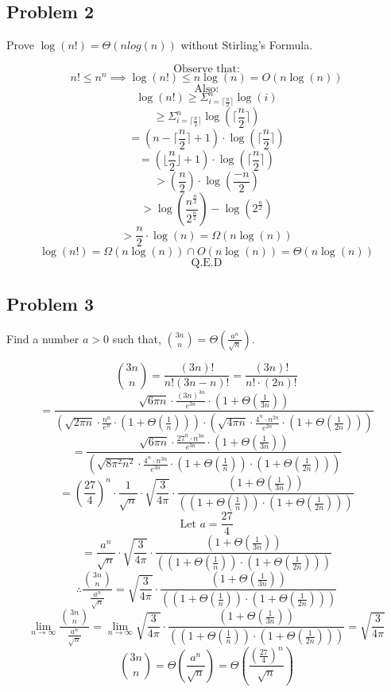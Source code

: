 \documentclass{article}
\begin{document}
\subsection{Problem 2}
Prove $\log(n!) = \Theta(n log(n))$ without Stirling's Formula.

$$\text{Observe that:}$$
$$n! \le n^n \implies \log(n!) \le n\log(n) = O(n\log(n))$$
$$\text{Also:}$$
$$\log(n!) \ge \Sigma_{i = \lceil \frac{n}{2} \rceil}^{n} \log(i)$$
$$\ge \Sigma_{i = \lceil \frac{n}{2} \rceil}^{n} \log(\lceil \frac{n}{2} \rceil)$$
$$= (n - \lceil \frac{n}{2} \rceil +1) \cdot \log(\lceil \frac{n}{2} \rceil)$$
$$= (\lfloor \frac{n}{2} \rfloor +1) \cdot \log(\lceil \frac{n}{2} \rceil)$$
$$> (\frac{n}{2}) \cdot \log(\frac{-n}{2})$$
$$> \log(\frac{n^{\frac{n}{2}}}{2^\frac{n}{2}}) - \log(2^\frac{n}{2})$$
$$> \frac{n}{2} \cdot \log(n) = \Omega(n \log(n))$$
$$\log(n!) = \Omega(n\log(n)) \cap O(n\log(n)) = \Theta(n \log(n))$$
$$\text{Q.E.D}$$


\subsection{Problem 3}
Find a number $a > 0$ such that, $\binom{3n}{n} = \Theta(\frac{a^n}{\sqrt{n}})$.

$$\binom{3n}{n} = \frac{(3n)!}{n!(3n-n)!} = \frac{(3n)!}{n! \cdot (2n)!}$$
$$= \frac{\sqrt{6\pi n} \cdot \frac{(3n)^{3n}}{e^{3n}} \cdot (1 + \Theta(\frac{1}{3n})) }{(\sqrt{2\pi n} \cdot \frac{n^n}{e^n} \cdot (1 + \Theta(\frac{1}{n})) ) \cdot (\sqrt{4 \pi n} \cdot \frac{4^n \cdot n^{2n}}{e^{2n}} \cdot (1 + \Theta(\frac{1}{2n})))  }$$
$$= \frac{\sqrt{6\pi n} \cdot \frac{27^n \cdot n^{3n}}{e^{3n}} \cdot (1 + \Theta(\frac{1}{3n})) }{(\sqrt{8\pi^2 n^2} \cdot \frac{4^n \cdot n^{3n}}{e^{3n}} \cdot (1 + \Theta(\frac{1}{n})) \cdot (1 + \Theta(\frac{1}{2n})))}$$
$$= (\frac{27}{4})^n \cdot \frac{1}{\sqrt{n}} \cdot \sqrt{\frac{3}{4\pi}} \cdot \frac{(1 + \Theta(\frac{1}{3n})) }{((1 + \Theta(\frac{1}{n})) \cdot (1 + \Theta(\frac{1}{2n})))}$$
$$\text{Let } a = \frac{27}{4}$$
$$= \frac{a^n}{\sqrt{n}} \cdot \sqrt{\frac{3}{4\pi}} \cdot \frac{(1 + \Theta(\frac{1}{3n})) }{((1 + \Theta(\frac{1}{n})) \cdot (1 + \Theta(\frac{1}{2n})))}$$
$$\therefore \frac{\binom{3n}{n}}{\frac{a^n}{\sqrt{n}}} = \sqrt{\frac{3}{4\pi}} \cdot \frac{(1 + \Theta(\frac{1}{3n})) }{((1 + \Theta(\frac{1}{n})) \cdot (1 + \Theta(\frac{1}{2n})))}$$
$$\lim_{n \rightarrow \infty} \frac{\binom{3n}{n}}{\frac{a^n}{\sqrt{n}}} = \lim_{n \rightarrow \infty} \sqrt{\frac{3}{4\pi}} \cdot \frac{(1 + \Theta(\frac{1}{3n})) }{((1 + \Theta(\frac{1}{n})) \cdot (1 + \Theta(\frac{1}{2n})))} = \sqrt{\frac{3}{4\pi}}$$
$$\binom{3n}{n} = \Theta(\frac{a^n}{\sqrt{n}}) = \Theta(\frac{(\frac{27}{4})^n}{\sqrt{n}})$$
\end{document}

